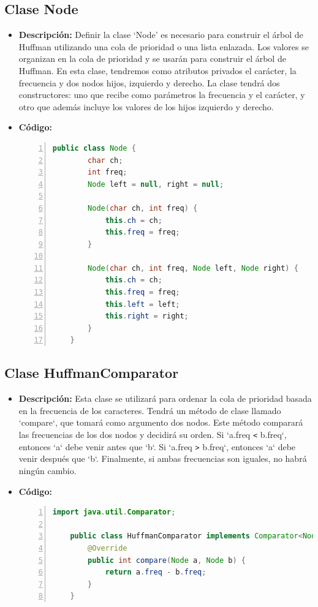\documentclass{article}
\begin{document}
  \subsection{Clase Node}
  \begin{itemize}
    \item \textbf{Descripción: }Definir la clase ‘Node’ es necesario para construir el árbol de Huffman utilizando una cola de prioridad 
    o una lista enlazada. Los valores se organizan en la cola de prioridad y se usarán para construir el árbol de Huffman.
    \newline
    En esta clase, tendremos como atributos privados el carácter, la frecuencia y dos nodos hijos, izquierdo y derecho. 
    La clase tendrá dos constructores: uno que recibe como parámetros la frecuencia y el carácter, y otro que además incluye 
    los valores de los hijos izquierdo y derecho.
    \item \textbf{Código: }
    \begin{lstlisting}[language=java, numbers=left, firstnumber=1, numberstyle=\color{orange}]
    public class Node {
        char ch;
        int freq;
        Node left = null, right = null;

        Node(char ch, int freq) {
            this.ch = ch;
            this.freq = freq;
        }

        Node(char ch, int freq, Node left, Node right) {
            this.ch = ch;
            this.freq = freq;
            this.left = left;
            this.right = right;
        }
    }
    \end{lstlisting}
  \end{itemize}
  
  \subsection{Clase HuffmanComparator}
  \begin{itemize}
    \item \textbf{Descripción: }Esta clase se utilizará para ordenar la cola de prioridad basada en la frecuencia de 
    los caracteres. Tendrá un método de clase llamado `compare`, que tomará como argumento dos nodos. Este método 
    comparará las frecuencias de los dos nodos y decidirá su orden. Si `a.freq \verb|<| b.freq`, entonces `a` debe venir 
    antes que `b`. Si `a.freq \verb|>| b.freq`, entonces `a` debe venir después que `b`. Finalmente, si ambas frecuencias 
    son iguales, no habrá ningún cambio.
    \item \textbf{Código: }
    \begin{lstlisting}[language=java, numbers=left, firstnumber=1, numberstyle=\color{orange}]
    import java.util.Comparator;
    
    public class HuffmanComparator implements Comparator<Node> {
        @Override
        public int compare(Node a, Node b) {
            return a.freq - b.freq;
        }
    }
    \end{lstlisting}
  \end{itemize}
  
\end{document}
